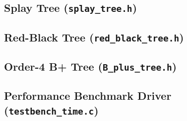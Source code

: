 \documentclass[10pt, a4paper]{article}
\begin{document}
\subsection{Splay Tree (\texttt{splay\_tree.h})}


\subsection{Red-Black Tree (\texttt{red\_black\_tree.h})}



\subsection{Order-4 B+ Tree (\texttt{B\_plus\_tree.h})}


\subsection{Performance Benchmark Driver (\texttt{testbench\_time.c})}

\end{document}
